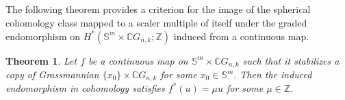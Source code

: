 \documentclass{amsart}
\newtheorem{theorem}{Theorem}[section]
\begin{document}
	\subsection{} The following theorem provides %
a criterion for the image of the spherical cohomology class mapped to a scaler multiple of itself under the graded endomorphism on
	$H^*(\mathbb{S}^m \times \mathbb{C}G_{n,k};\mathbb Z)$ induced from a continuous map.
	
	
	
	\begin{theorem}\label{ind from top}
		Let $f$ be a continuous map on $\mathbb S^m\times \mathbb CG_{n,k}$ such that it stabilizes a %
copy of Grassmannian %
$\{{x_0}\}\times \mathbb CG_{n,k}$ for some $x_0\in \mathbb S^m.$ Then the induced endomorphism in cohomology satisfies $f^*(u) = \mu u$ for some $\mu \in \mathbb Z$.
	\end{theorem}
	
	
	
\end{document}
